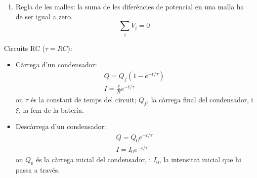 \documentclass[../../../main.tex]{subfiles}
\begin{document}
\begin{multicols}{2}
\begin{enumerate}
        \item Regla de les malles: la suma de les diferències de potencial en una malla ha de ser igual a zero. $$\sum_iV_i=0$$
    \end{enumerate}
    Circuits RC ($\tau=RC$):
    \begin{itemize}
        \item Càrrega d'un condensador:
              \begin{gather*}
                  Q=Q_f(1-e^{-t/\tau})\\
                  I=\frac{\xi}{R}e^{-t/\tau}
              \end{gather*}
              {on $\tau$ és la constant de temps del circuit; $Q_f$, la càrrega final del condensador, i $\xi$, la fem de la bateria.}
        \item Descàrrega d'un condensador:
              \begin{gather*}
                  Q=Q_0e^{-t/\tau}\\
                  I=I_0e^{-t/\tau}
              \end{gather*}
              {on $Q_0$ és la càrrega inicial del condensador, i $I_0$, la intensitat inicial que hi passa a través.}\textbf{}
    \end{itemize}

\end{multicols}
\end{document}
